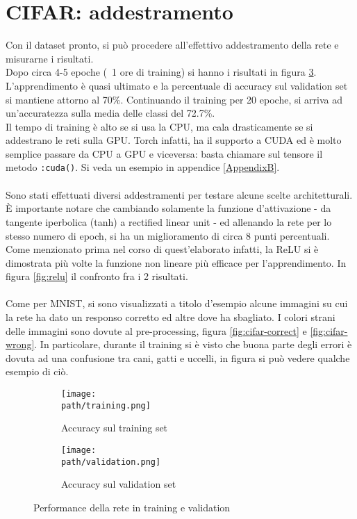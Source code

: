\section{CIFAR: addestramento}
Con il dataset pronto, si può procedere all'effettivo addestramento della rete e misurarne i risultati.\\
Dopo circa 4-5 epoche (~1 ore di training) si hanno i risultati in figura \ref{fig:cifar-compare}. L'apprendimento è quasi ultimato e la percentuale di accuracy sul validation set si mantiene attorno al 70\%. Continuando il training per 20 epoche, si arriva ad un'accuratezza sulla media delle classi del 72.7\%. \\
Il tempo di training è alto se si usa la CPU, ma cala drasticamente se si addestrano le reti sulla GPU. Torch infatti, ha il supporto a CUDA\parencite{cuda} ed è molto semplice passare da CPU a GPU e viceversa: basta chiamare sul tensore il metodo \texttt{:cuda()}. Si veda un esempio in appendice \ref{AppendixB}. 
\\
\\
Sono stati effettuati diversi addestramenti per testare alcune scelte architetturali. È importante notare che cambiando solamente la funzione d'attivazione - da tangente iperbolica (tanh) a rectified linear unit - ed allenando la rete per lo stesso numero di epoch, si ha un miglioramento di circa 8 punti percentuali. Come menzionato prima nel corso di quest'elaborato infatti, la ReLU si è dimostrata più volte la funzione non lineare più efficace per l'apprendimento. In figura \ref{fig:relu} il confronto fra i 2 risultati.
\\
\\
Come per MNIST, si sono visualizzati a titolo d'esempio alcune immagini su cui la rete ha dato un responso corretto ed altre dove ha sbagliato. I colori strani delle immagini sono dovute al pre-processing, figura \ref{fig:cifar-correct} e \ref{fig:cifar-wrong}. In particolare, durante il training si è visto che buona parte degli errori è dovuta ad una confusione tra cani, gatti e uccelli, in figura si può vedere qualche esempio di ciò.
\newpage

\begin{figure}
\centering
\begin{subfigure}{.5\textwidth}
  \centering
 \texttt{[image: \\path/training.png]} 
  \caption{Accuracy sul training set}
 \label{fig:training}
\end{subfigure}%
\begin{subfigure}{.5\textwidth}
  \centering
 \texttt{[image: \\path/validation.png]} 
  \caption{Accuracy sul validation set}
 \label{fig:validation}
\end{subfigure}
\caption{Performance della rete in training e validation}
\label{fig:cifar-compare}
\end{figure} 

